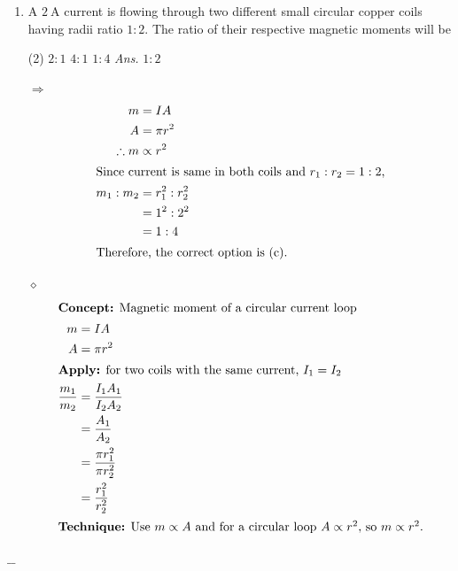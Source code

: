 \documentclass[preview, border={10mm, 5mm, 10mm, 10mm}]{standalone}
\title{\textsc{}}
\newcommand{\ans}{\textcolor{blue!20!red}{\textit{\quad Ans.}}}
\newenvironment{solution}{\par\noindent\color{red!80!black}$\Rightarrow$\enspace\ignorespaces}{\par}
\newenvironment{idea}{\par\noindent\color{violet!80!black}$\diamond$\enspace\ignorespaces}{\par}
\begin{document}
\begin{enumerate}[leftmargin=*]
\item A $2 \ \mathrm{A}$ current is flowing through two different small circular copper coils having radii ratio $1 : 2$. The ratio of their respective magnetic moments will be
\begin{tasks}(2)
    \task $2 : 1$
    \task $4 : 1$
    \task $1 : 4$ \ans
    \task $1 : 2$
\end{tasks}
\begin{solution}
    \begin{align*}
    m &= I A\\
    A &= \pi r^2\\
    \therefore m &\propto r^2\\
    \intertext{Since current is same in both coils and $r_1 : r_2 = 1 : 2$,}
    m_1 : m_2 &= r_1^2 : r_2^2\\
    &= 1^2 : 2^2\\
    &= 1 : 4\\
    \intertext{Therefore, the correct option is (c).}
    \end{align*}
\end{solution}

\begin{idea}
    \begin{align*}
    \intertext{\textbf{Concept:} Magnetic moment of a circular current loop}
    m &= IA \\
    A &= \pi r^2 \\
    \intertext{\textbf{Apply:} for two coils with the same current, $I_1=I_2$}
    \frac{m_1}{m_2} &= \frac{I_1A_1}{I_2A_2} \\
    &= \frac{A_1}{A_2} \\
    &= \frac{\pi r_1^2}{\pi r_2^2} \\
    &= \frac{r_1^2}{r_2^2} \\
    \intertext{\textbf{Technique:} Use $m \propto A$ and for a circular loop $A \propto r^2$, so $m \propto r^2$.}
    \end{align*}
\end{idea}
\end{enumerate}
\hfill $\_\_$
\end{document}
